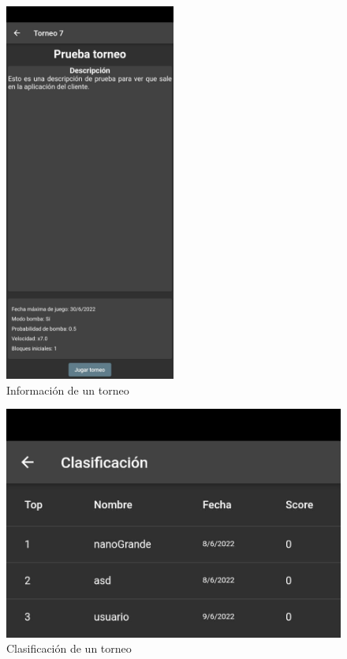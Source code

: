 \documentclass{article}
\begin{document}
\begin{figure}[H]
  \centering
  \includegraphics[width=0.5\textwidth]{imagenes/torneo.jpeg}
  \caption{Información de un torneo} 
\end{figure} 

\begin{figure}[H]
  \includegraphics[width=\textwidth]{imagenes/clasTorneo.jpeg}
  \caption{Clasificación de un torneo} 
\end{figure} 
\end{document}
